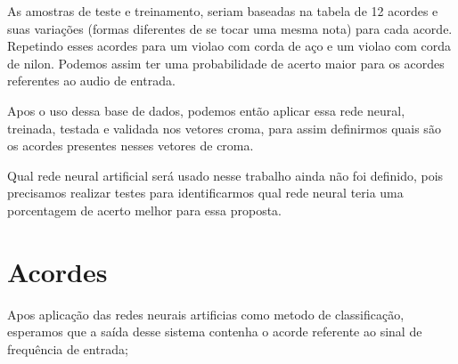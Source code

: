 As amostras de teste e treinamento, seriam baseadas na tabela de 12 acordes e suas variações (formas diferentes de se tocar uma mesma nota) para cada acorde. 
Repetindo esses acordes para um violao com corda de aço e um violao com corda de nilon.
Podemos assim ter uma probabilidade de acerto maior para os acordes referentes ao audio de entrada.

Apos o uso dessa base de dados, podemos então aplicar essa rede neural, treinada, testada e validada nos vetores croma, para assim definirmos quais são os acordes presentes nesses vetores de croma.

Qual rede neural artificial será usado nesse trabalho ainda não foi definido, pois precisamos realizar testes para identificarmos qual rede neural teria uma porcentagem de acerto melhor para essa proposta.

\section{Acordes}
\label{cap:acrodes}
Apos aplicação das redes neurais artificias como metodo de classificação, esperamos que a saída desse sistema contenha o acorde referente ao sinal de frequência de entrada;





